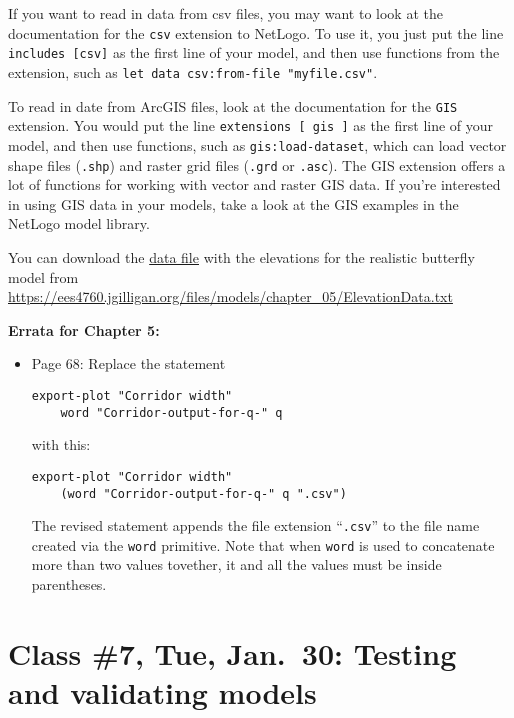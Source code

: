 \documentclass[]{article}
\begin{document}
If you want to read in data from csv files, you may want to look at the
documentation for the \texttt{csv} extension to NetLogo. To use it, you
just put the line \texttt{includes\ {[}csv{]}} as the first line of your
model, and then use functions from the extension, such as
\texttt{let\ data\ csv:from-file\ "myfile.csv"}.

To read in date from ArcGIS files, look at the documentation for the
\texttt{GIS} extension. You would put the line
\texttt{extensions\ {[}\ gis\ {]}} as the first line of your model, and
then use functions, such as \texttt{gis:load-dataset}, which can load
vector shape files (\texttt{.shp}) and raster grid files (\texttt{.grd}
or \texttt{.asc}). The GIS extension offers a lot of functions for
working with vector and raster GIS data. If you're interested in using
GIS data in your models, take a look at the GIS examples in the NetLogo
model library.

You can download the
\href{/files/models/chapter_05/ElevationData.txt}{data file} with the
elevations for the realistic butterfly model from
\url{https://ees4760.jgilligan.org/files/models/chapter_05/ElevationData.txt}

\textbf{Errata for Chapter 5:}

\begin{itemize}
\item
  Page 68: Replace the statement

\begin{verbatim}
export-plot "Corridor width"
    word "Corridor-output-for-q-" q
\end{verbatim}

  with this:

\begin{verbatim}
export-plot "Corridor width"
    (word "Corridor-output-for-q-" q ".csv")
\end{verbatim}

  The revised statement appends the file extension ``\texttt{.csv}'' to
  the file name created via the \texttt{word} primitive. Note that when
  \texttt{word} is used to concatenate more than two values tovether, it
  and all the values must be inside parentheses.
\end{itemize}

\hypertarget{class-7-tue-jan.30-testing-and-validating-models}{%
\section{Class \#7, Tue, Jan.~30: Testing and validating
models}\label{class-7-tue-jan.30-testing-and-validating-models}}
\end{document}
